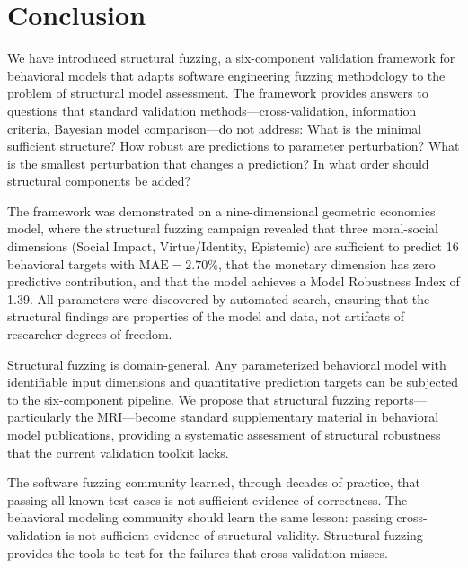 \documentclass[12pt]{article}
\newcommand{\MAE}{\mathrm{MAE}}
\begin{document}
\section{Conclusion}
\label{sec:conclusion}

We have introduced structural fuzzing, a six-component validation framework for behavioral models that adapts software engineering fuzzing methodology to the problem of structural model assessment.  The framework provides answers to questions that standard validation methods---cross-validation, information criteria, Bayesian model comparison---do not address: What is the minimal sufficient structure?  How robust are predictions to parameter perturbation?  What is the smallest perturbation that changes a prediction?  In what order should structural components be added?

The framework was demonstrated on a nine-dimensional geometric economics model, where the structural fuzzing campaign revealed that three moral-social dimensions (Social Impact, Virtue/Identity, Epistemic) are sufficient to predict 16 behavioral targets with $\MAE = 2.70\%$, that the monetary dimension has zero predictive contribution, and that the model achieves a Model Robustness Index of 1.39.  All parameters were discovered by automated search, ensuring that the structural findings are properties of the model and data, not artifacts of researcher degrees of freedom.

Structural fuzzing is domain-general.  Any parameterized behavioral model with identifiable input dimensions and quantitative prediction targets can be subjected to the six-component pipeline.  We propose that structural fuzzing reports---particularly the MRI---become standard supplementary material in behavioral model publications, providing a systematic assessment of structural robustness that the current validation toolkit lacks.

The software fuzzing community learned, through decades of practice, that passing all known test cases is not sufficient evidence of correctness.  The behavioral modeling community should learn the same lesson: passing cross-validation is not sufficient evidence of structural validity.  Structural fuzzing provides the tools to test for the failures that cross-validation misses.
\end{document}
